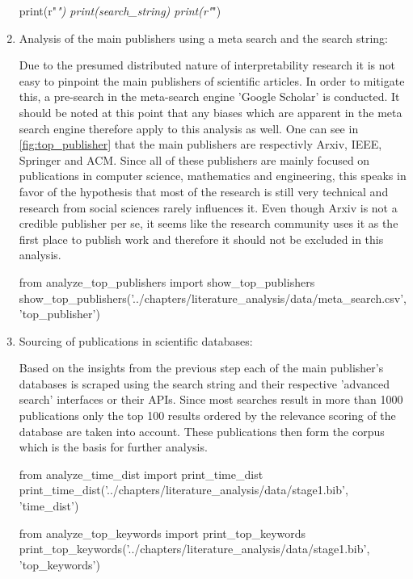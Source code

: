 \begin{enumerate}
\begin{pycode}
	print(r"\textit{")
	print(search_string)
	print(r"}")
\end{pycode}
	
	
	\item Analysis of the main publishers using a meta search and the search string:
	
	Due to the presumed distributed nature of interpretability research it is not easy to pinpoint the main publishers of scientific articles. In order to mitigate this, a pre-search in the meta-search engine 'Google Scholar' is conducted. It should be noted at this point that any biases which are apparent in the meta search engine therefore apply to this analysis as well. One can see in \autoref{fig:top_publisher} that the main publishers are respectivly Arxiv, IEEE, Springer and ACM. Since all of these publishers are mainly focused on publications in computer science, mathematics and engineering, this speaks in favor of the hypothesis that most of the research is still very technical and research from social sciences rarely influences it. Even though Arxiv is not a credible publisher per se, it seems like the research community uses it as the first place to publish work and therefore it should not be excluded in this analysis. 
	
\begin{pycode}
from analyze_top_publishers import show_top_publishers
show_top_publishers('../chapters/literature_analysis/data/meta_search.csv', 'top_publisher')
\end{pycode}

	\item Sourcing of publications in scientific databases:
	
	Based on the insights from the previous step each of the main publisher's databases is scraped using the search string and their respective 'advanced search' interfaces or their APIs. Since most searches result in more than 1000 publications only the top 100 results ordered by the relevance scoring of the database are taken into account. These publications then form the corpus which is the basis for further analysis.

\begin{pycode}
from analyze_time_dist import print_time_dist
print_time_dist('../chapters/literature_analysis/data/stage1.bib', 'time_dist')
\end{pycode}

\begin{pycode}
from analyze_top_keywords import print_top_keywords
print_top_keywords('../chapters/literature_analysis/data/stage1.bib', 'top_keywords')
\end{pycode}
	

\end{enumerate}
